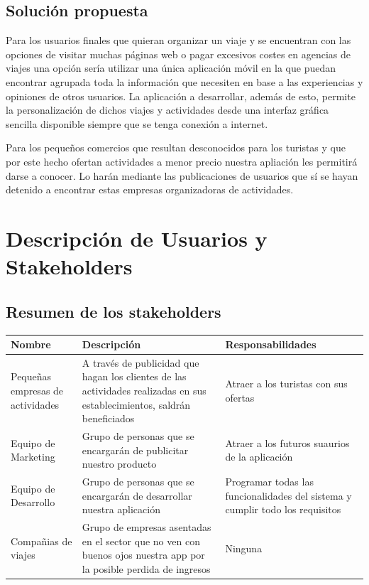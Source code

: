 \documentclass[11pt]{article}
\begin{document}
\subsection{Solución propuesta}
Para los usuarios finales que quieran organizar un viaje y se encuentran con las opciones de visitar muchas páginas web o pagar excesivos costes en agencias de viajes una opción sería utilizar una única aplicación móvil en la que puedan encontrar agrupada toda la información que necesiten en base a las experiencias y opiniones de otros usuarios. La aplicación a desarrollar, además de esto, permite la personalización de dichos viajes y actividades desde una interfaz gráfica sencilla disponible siempre que se tenga conexión a internet.

Para los pequeños comercios que resultan desconocidos para los turistas y que por este hecho ofertan actividades a menor precio nuestra apliación les permitirá darse a conocer. Lo harán mediante las publicaciones de usuarios que sí se hayan detenido a encontrar estas empresas organizadoras de actividades.
\newpage

\section{Descripción de Usuarios y Stakeholders}

\subsection{Resumen de los stakeholders}
\begin{table}[H]
  \centering
  \begin{tabular}{p{0.2\linewidth}p{0.4\linewidth}p{0.4\linewidth}}
    \toprule
    \textbf{Nombre} & \textbf{Descripción} & \textbf{Responsabilidades} \\
    \midrule
    Pequeñas empresas de actividades & A través de publicidad que hagan los clientes de las actividades realizadas en sus establecimientos, saldrán beneficiados & Atraer a los turistas con sus ofertas\\
    \bottomrule
    \midrule
    Equipo de Marketing& Grupo de personas que se encargarán de publicitar nuestro producto & Atraer a los futuros suaurios de la aplicación\\
    \bottomrule
    \midrule
    Equipo de Desarrollo& Grupo de personas que se encargarán de desarrollar nuestra aplicación & Programar todas las funcionalidades del sistema y cumplir todo los requisitos\\
    \bottomrule
    \midrule
    Compañias de viajes& Grupo de empresas asentadas en el sector que no ven con buenos ojos nuestra app por la posible perdida de ingresos & Ninguna\\
    \bottomrule
  \end{tabular}
\end{table}
\end{document}
